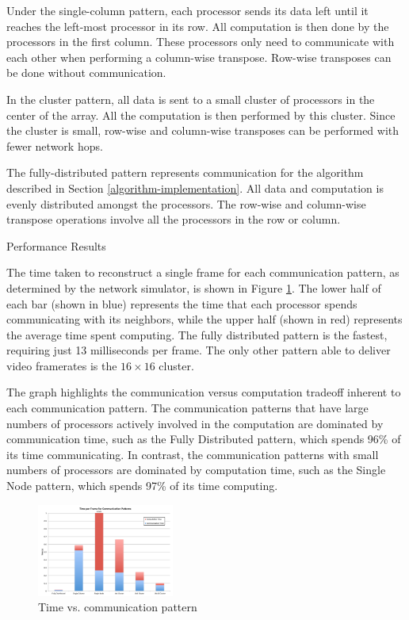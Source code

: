 \documentclass[twocolumn]{article}
\makeatletter
\def\section{\@startsection{section}{1}{\z@}{24pt plus 2 pt
minus 2 pt} {12pt plus 2pt minus 2pt}{\large\bf}}
\makeatother
\begin{document}
Under the single-column pattern, each processor sends its data left until it reaches the left-most processor in its row. All computation is then done by the processors in the first column. These processors only need to communicate with each other when performing a column-wise transpose. Row-wise transposes can be done without communication.

In the cluster pattern, all data is sent to a small cluster of processors in the center of the array. All the computation is then performed by this cluster. Since the cluster is small, row-wise and column-wise transposes can be performed with fewer network hops.

The fully-distributed pattern represents communication for the algorithm described in Section \ref{algorithm-implementation}. All data and computation is evenly distributed amongst the processors. The row-wise and column-wise transpose operations involve all the processors in the row or column.

\section{Performance Results}

The time taken to reconstruct a single frame for each communication pattern, as determined by the network simulator, is shown in Figure \ref{time vs comm pattern}. The lower half of each bar (shown in blue) represents the time that each processor spends communicating with its neighbors, while the upper half (shown in red) represents the average time spent computing. The fully distributed pattern is the fastest, requiring just 13 milliseconds per frame. The only other pattern able to deliver video framerates is the $16\times16$ cluster. 

The graph highlights the communication versus computation tradeoff inherent to each communication pattern. 
The communication patterns that have large numbers of processors actively involved in the computation are dominated by communication time, such as the Fully Distributed pattern, which spends 96\% of its time communicating.
In contrast, the communication patterns with small numbers of processors are dominated by computation time, such as the Single Node pattern, which spends 97\% of its time computing.

\begin{figure}[!h]
\centering
\includegraphics*[width=0.4\textwidth]{figures/chart5.pdf}
\caption{Time vs. communication pattern}
\label{time vs comm pattern}
\end{figure}
\end{document}
